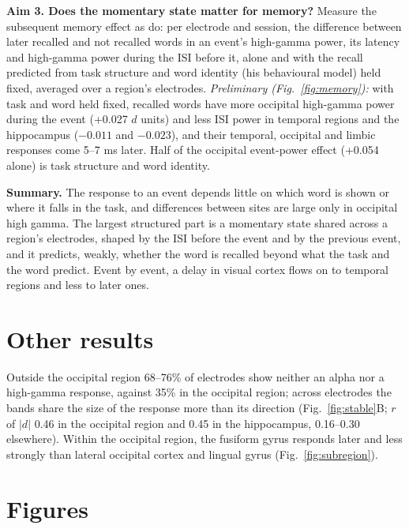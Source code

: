\documentclass[11pt]{article}
\begin{document}
\textbf{Aim 3. Does the momentary state matter for memory?} Measure the subsequent memory effect as
\citet{DeHaan_2026} do: per electrode and session, the difference between later recalled and not recalled words in
an event's high-gamma power, its latency and high-gamma power during the ISI before it, alone and with the recall
predicted from task structure and word identity (his behavioural model) held fixed, averaged over a region's
electrodes. \emph{Preliminary (Fig.~\ref{fig:memory}):} with task and word held fixed, recalled words have more
occipital high-gamma power during the event (+0.027 $d$ units) and less ISI power in temporal regions and the
hippocampus ($-0.011$ and $-0.023$), and their temporal, occipital and limbic responses come 5--7 ms later. Half
of the occipital event-power effect (+0.054 alone) is task structure and word identity.

\textbf{Summary.} The response to an event depends little on which word is shown or where it falls in the task, and
differences between sites are large only in occipital high gamma. The largest structured part is a momentary state
shared across a region's electrodes, shaped by the ISI before the event and by the previous event, and it
predicts, weakly, whether the word is recalled beyond what the task and the word predict. Event by event, a
delay in visual cortex flows on to temporal regions and less to later ones.

\section*{Other results}
Outside the occipital region 68--76\% of electrodes show neither an alpha nor a high-gamma response, against 35\% in
the occipital region; across electrodes the bands share the size of the response more than its direction
(Fig.~\ref{fig:stable}B; $r$ of $|d|$ 0.46 in the occipital region and 0.45 in the hippocampus, 0.16--0.30 elsewhere). Within the occipital region, the fusiform gyrus responds later and
less strongly than lateral occipital cortex and lingual gyrus (Fig.~\ref{fig:subregion}).

\section*{Figures}
\end{document}
